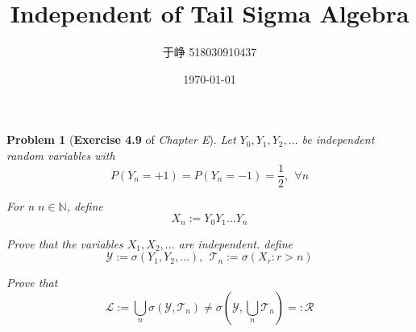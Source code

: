 \documentclass[UTF8, 12pt]{article}
\title{Independent of Tail Sigma Algebra}
\author{于峥 518030910437}
\date{\today}
\theoremstyle{break}
\newtheorem{problem}{Problem}
\begin{document}
    \maketitle
    
    \begin{problem}[\textbf{Exercise 4.9} of \textit{Chapter E}]
        Let $Y_0, Y_1, Y_2, \dots$ be independent random variables with
        $$
        P(Y_n = +1) = P(Y_n = -1) = \frac 1 2, ~~ \forall n
        $$

        For n $n \in \mathbb{N}$, define
        $$
        X_n := Y_0Y_1\dots Y_n
        $$

        Prove that the variables $X_1, X_2, \dots$ are independent. define
        $$
        \mathcal{Y} := \sigma(Y_1,Y_2,\dots), ~~ \mathcal{T}_n := \sigma(X_r : r > n)
        $$

        Prove that
        $$
        \mathcal{L} := \bigcup _n \sigma(\mathcal{Y}, \mathcal{T}_n) \not= \sigma \left( \mathcal{Y}, \bigcup_n \mathcal{T}_n \right) =: \mathcal{R}
        $$
    \end{problem}
        
\end{document}
